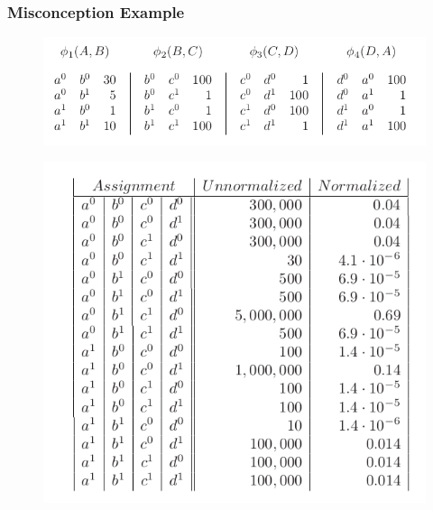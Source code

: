 \documentclass[11pt]{beamer}
\begin{document}
\begin{frame}
\frametitle{Misconception Example}
\begin{figure}
	\centering
	\includegraphics[width=0.7\linewidth]{pic/factor}
	\label{fig:factor}
\end{figure}
\begin{figure}
	\centering
	\includegraphics[width=0.7\linewidth]{pic/joint}
	\label{fig:joint}
\end{figure}


\end{frame}
\end{document}
